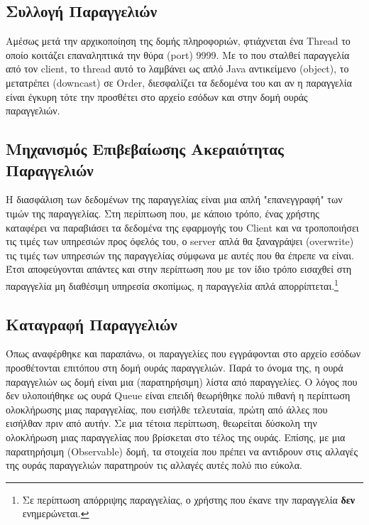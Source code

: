        \subsection{Συλλογή Παραγγελιών}
        \label{sec:SubSectionName2.2.3}
        Αμέσως μετά την αρχικοποίηση της δομής πληροφοριών, φτιάχνεται ένα Thread το οποίο κοιτάζει επαναληπτικά την θύρα (port) 9999. Με το που σταλθεί παραγγελία από τον client, το thread αυτό το λαμβάνει ως απλό Java αντικείμενο (object), το μετατρέπει (downcast) σε Order, διεσφαλίζει τα δεδομένα του και αν η παραγγελία είναι έγκυρη τότε την προσθέτει στο αρχείο εσόδων και στην δομή ουράς παραγγελιών.

        \subsection{Μηχανισμός Επιβεβαίωσης Ακεραιότητας Παραγγελιών}
        \label{sec:SubSectionName2.2.4}
        Η διασφάλιση των δεδομένων της παραγγελίας είναι μια απλή "επανεγγραφή" των τιμών της παραγγελίας. Στη περίπτωση που, με κάποιο τρόπο, ένας χρήστης καταφέρει να παραβιάσει τα δεδομένα της εφαρμογής του Client και να τροποποιήσει τις τιμές των υπηρεσιών προς όφελός του, ο server απλά θα ξαναγράψει (overwrite) τις τιμές των υπηρεσιών της παραγγελίας σύμφωνα με αυτές που θα έπρεπε να είναι. Έτσι αποφεύγονται απάντες και στην περίπτωση που με τον ίδιο τρόπο εισαχθεί στη παραγγελία μη διαθέσιμη υπηρεσία σκοπίμως, η παραγγελία απλά απορρίπτεται.\footnote{Σε περίπτωση απόρριψης παραγγελίας, ο χρήστης που έκανε την παραγγελία \textbf{δεν} ενημερώνεται.}
    
        \subsection{Καταγραφή Παραγγελιών}
        \label{sec:SubSectionName2.2.5}
        Όπως αναφέρθηκε και παραπάνω, οι παραγγελίες που εγγράφονται στο αρχείο εσόδων προσθέτονται επιτόπου στη δομή ουράς παραγγελιών. Παρά το όνομα της, η ουρά παραγγελιών ως δομή είναι μια (παρατηρήσιμη) λίστα από παραγγελίες. Ο λόγος που δεν υλοποιήθηκε ως ουρά Queue είναι επειδή θεωρήθηκε πολύ πιθανή η περίπτωση ολοκλήρωσης μιας παραγγελίας, που εισήλθε τελευταία, πρώτη από άλλες που εισήλθαν πριν από αυτήν. Σε μια τέτοια περίπτωση, θεωρείται δύσκολη την ολοκλήρωση μιας παραγγελίας που βρίσκεται στο τέλος της ουράς. Επίσης, με μια παρατηρήσιμη (Observable) δομή, τα στοιχεία που πρέπει να αντιδρουν στις αλλαγές της ουράς παραγγελιών παρατηρούν τις αλλαγές αυτές πολύ πιο εύκολα.
        
